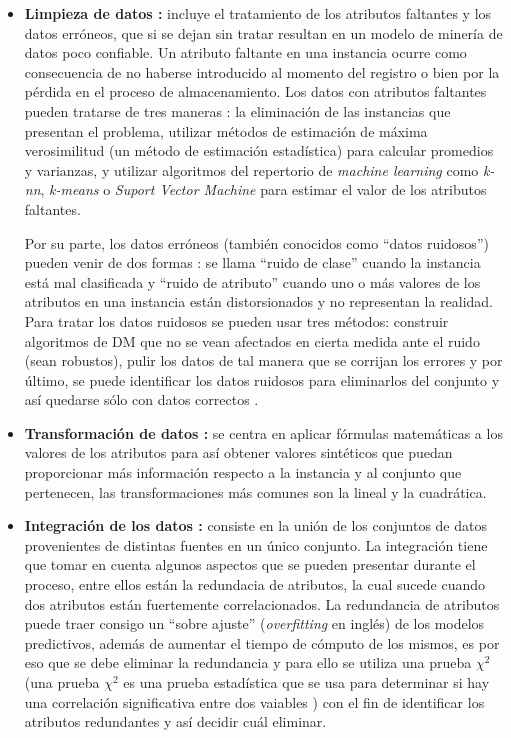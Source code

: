 \begin{itemize}
\item \textbf{Limpieza de datos \cite{garcia2016data, kim2003taxonomy}:}
incluye el tratamiento de los atributos faltantes y los datos erróneos, que si se dejan sin tratar resultan en un modelo de minería de datos poco confiable. Un atributo faltante en una instancia ocurre como consecuencia de no haberse introducido al momento del registro o bien por la pérdida en el proceso de almacenamiento. Los datos con atributos faltantes pueden tratarse de tres maneras \cite{farhangfar2007novel}: la eliminación de las instancias que presentan el problema, utilizar métodos de estimación de máxima verosimilitud (un método de estimación estadística) para calcular promedios y varianzas, y utilizar algoritmos del repertorio de \emph{machine learning} como \emph{k-nn}, \emph{k-means} o \emph{Suport Vector Machine} para estimar el valor de los atributos faltantes. 

Por su parte, los datos erróneos (también conocidos como ``datos ruidosos'') pueden venir de dos formas \cite{catal2011class}: se llama ``ruido de clase'' cuando la instancia está mal clasificada y ``ruido de atributo'' cuando uno o más valores de los atributos en una instancia están distorsionados y no representan la realidad. Para tratar los datos ruidosos se pueden usar tres métodos: construir algoritmos de DM que no se vean afectados en cierta medida ante el ruido (sean robustos), pulir los datos \cite{teng1999correcting} de tal manera que se corrijan los errores y por último, se puede identificar los datos ruidosos para eliminarlos del conjunto y así quedarse sólo con datos correctos \cite{brodley1999identifying}.

\item \textbf{Transformación de datos \cite{garcia2016data}:}
se centra en aplicar fórmulas matemáticas a los valores de los atributos para así obtener valores sintéticos que puedan proporcionar más información respecto a la instancia y al conjunto que pertenecen, las transformaciones más comunes son la lineal y la cuadrática.

\item \textbf{Integración de los datos \cite{garcia2016data,batini1986comparative}:}
consiste en la unión de los conjuntos de datos provenientes de distintas fuentes en un único conjunto. La integración tiene que tomar en cuenta algunos aspectos que se pueden presentar durante el proceso, entre ellos están la redundacia de atributos, la cual sucede cuando dos atributos están fuertemente correlacionados. La redundancia de atributos puede traer consigo un ``sobre ajuste'' (\emph{overfitting} en inglés) de los modelos predictivos, además de aumentar el tiempo de cómputo de los mismos, es por eso que se debe eliminar la redundancia y para ello se utiliza una prueba $\chi^2$ (una prueba $\chi^2$ es una prueba estadística que se usa para determinar si hay una correlación significativa entre dos vaiables \cite{tallarida1987chi}) con el fin de identificar los atributos redundantes y así decidir cuál eliminar. 


\end{itemize}
